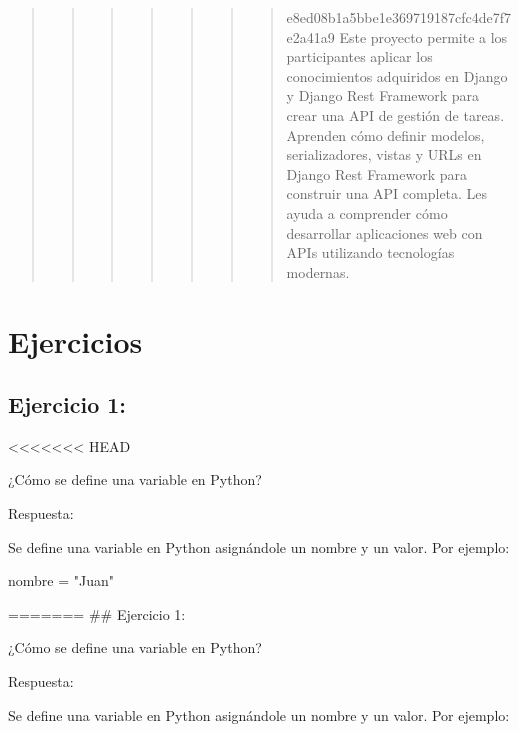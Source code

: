 \documentclass[
  a4paper,
  onepage,
  openany]{scrreprt}
\newenvironment{Shaded}{\begin{snugshade}}{\end{snugshade}}
\newcommand{\NormalTok}[1]{\textcolor[rgb]{0.00,0.23,0.31}{#1}}
\newcommand{\OperatorTok}[1]{\textcolor[rgb]{0.37,0.37,0.37}{#1}}
\newcommand{\StringTok}[1]{\textcolor[rgb]{0.13,0.47,0.30}{#1}}
\begin{document}
\begin{quote}
\begin{quote}
\begin{quote}
\begin{quote}
\begin{quote}
\begin{quote}
\begin{quote}
e8ed08b1a5bbe1e369719187cfc4de7f7e2a41a9 Este proyecto permite a los
participantes aplicar los conocimientos adquiridos en Django y Django
Rest Framework para crear una API de gestión de tareas. Aprenden cómo
definir modelos, serializadores, vistas y URLs en Django Rest Framework
para construir una API completa. Les ayuda a comprender cómo desarrollar
aplicaciones web con APIs utilizando tecnologías modernas.
\end{quote}
\end{quote}
\end{quote}
\end{quote}
\end{quote}
\end{quote}
\end{quote}

\part{Ejercicios}

\hypertarget{ejercicio-1}{%
\chapter{Ejercicio 1:}\label{ejercicio-1}}

\textless\textless\textless\textless\textless\textless\textless{} HEAD

¿Cómo se define una variable en Python?

Respuesta:

Se define una variable en Python asignándole un nombre y un valor. Por
ejemplo:

\begin{Shaded}
\begin{Highlighting}[]
\NormalTok{nombre }\OperatorTok{=} \StringTok{"Juan"}
\end{Highlighting}
\end{Shaded}

======= \#\# Ejercicio 1:

¿Cómo se define una variable en Python?

Respuesta:

Se define una variable en Python asignándole un nombre y un valor. Por
ejemplo:
\end{document}
